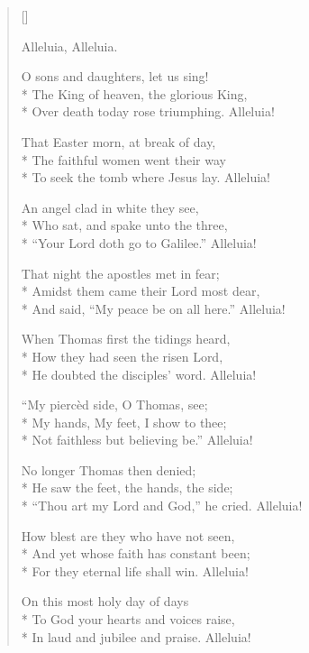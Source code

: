 \newHymn
{}
\settowidth{\versewidth}{O sons and daughters, let us sing}

\begin{verse}[\versewidth]

 Alleluia, Alleluia.

O sons and daughters, let us sing!\\*
The King of heaven, the glorious King,\\*
Over death today rose triumphing. Alleluia!
\pointorig

That Easter morn, at break of day,\\*
The faithful women went their way\\*
To seek the tomb where Jesus lay. Alleluia!

An angel clad in white they see,\\*
Who sat, and spake unto the three,\\*
``Your Lord doth go to Galilee.''
Alleluia!

That night the apostles met in fear;\\*
Amidst them came their Lord most dear,\\*
And said, ``My peace be on all here.''
Alleluia!

When Thomas first the tidings heard,\\*
How they had seen the risen Lord,\\*
He doubted the disciples' word.
Alleluia!

``My piercèd side, O Thomas, see;\\*
My hands, My feet, I show to thee;\\*
Not faithless but believing be.''
Alleluia!

No longer Thomas then denied;\\*
He saw the feet, the hands, the side;\\*
``Thou art my Lord and God,'' he cried.
Alleluia!

How blest are they who have not seen,\\*
And yet whose faith has constant been;\\*
For they eternal life shall win.
Alleluia!

On this most holy day of days\\*
To God your hearts and voices raise,\\*
In laud and jubilee and praise.
Alleluia!


\end{verse}

